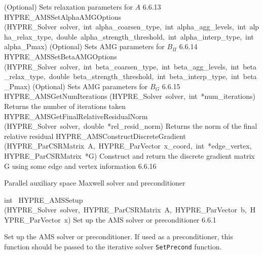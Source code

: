 \documentclass{article}
\begin{document}
\begin{cxxentry}
\begin{cxxentry}
\begin{cxxnames}
        {
(Optional) Sets relaxation parameters for $A$}
        {6.6.13}
        {HYPRE\_AMSSetAlphaAMGOptions}
        {(HYPRE\_Solver\ solver,\ int\ alpha\_coarsen\_type,\ int\ alpha\_agg\_levels,\ int\ alpha\_relax\_type,\ double\ alpha\_strength\_threshold,\ int\ alpha\_interp\_type,\ int\ alpha\_Pmax)}
        {
(Optional) Sets AMG parameters for $B_\Pi$}
        {6.6.14}
        {HYPRE\_AMSSetBetaAMGOptions}
        {(HYPRE\_Solver\ solver,\ int\ beta\_coarsen\_type,\ int\ beta\_agg\_levels,\ int\ beta\_relax\_type,\ double\ beta\_strength\_threshold,\ int\ beta\_interp\_type,\ int\ beta\_Pmax)}
        {
(Optional) Sets AMG parameters for $B_G$}
        {6.6.15}
        {HYPRE\_AMSGetNumIterations}
        {(HYPRE\_Solver\ solver,\ int\ *num\_iterations)}
        {
Returns the number of iterations taken}
        {}
\label{cxx.6.6.19}
        {HYPRE\_AMSGetFinalRelativeResidualNorm}
        {(HYPRE\_Solver\ solver,\ double\ *rel\_resid\_norm)}
        {
Returns the norm of the final relative residual}
        {}
\label{cxx.6.6.20}
        {HYPRE\_AMSConstructDiscreteGradient}
        {(HYPRE\_ParCSRMatrix\ A,\ HYPRE\_ParVector\ x\_coord,\ int\ *edge\_vertex,\ HYPRE\_ParCSRMatrix\ *G)}
        {
Construct and return the discrete gradient matrix G using some
edge and vertex information}
        {6.6.16}
\end{cxxnames}
\begin{cxxdoc}


Parallel auxiliary space Maxwell solver and preconditioner
\end{cxxdoc}
\begin{cxxfunction}
{int\ }
        {HYPRE\_AMSSetup}
        {(HYPRE\_Solver\ solver,\ HYPRE\_ParCSRMatrix\ A,\ HYPRE\_ParVector\ b,\ HYPRE\_ParVector\ x)}
        {
Set up the AMS solver or preconditioner}
        {6.6.1}
\begin{cxxdoc}

Set up the AMS solver or preconditioner.
If used as a preconditioner, this function should be passed
to the iterative solver {\tt SetPrecond} function.



\end{cxxdoc}
\end{cxxfunction}
\end{cxxentry}
\end{cxxentry}
\end{document}
